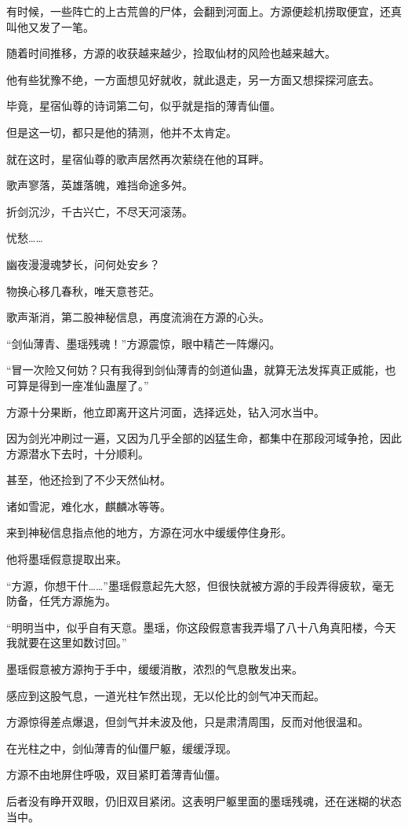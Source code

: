\begin{this_body}
有时候，一些阵亡的上古荒兽的尸体，会翻到河面上。方源便趁机捞取便宜，还真叫他又发了一笔。

随着时间推移，方源的收获越来越少，捡取仙材的风险也越来越大。

他有些犹豫不绝，一方面想见好就收，就此退走，另一方面又想探探河底去。

毕竟，星宿仙尊的诗词第二句，似乎就是指的薄青仙僵。

但是这一切，都只是他的猜测，他并不太肯定。

就在这时，星宿仙尊的歌声居然再次萦绕在他的耳畔。

歌声寥落，英雄落魄，难挡命途多舛。

折剑沉沙，千古兴亡，不尽天河滚荡。

忧愁……

幽夜漫漫魂梦长，问何处安乡？

物换心移几春秋，唯天意苍茫。

歌声渐消，第二股神秘信息，再度流淌在方源的心头。

“剑仙薄青、墨瑶残魂！”方源震惊，眼中精芒一阵爆闪。

“冒一次险又何妨？只有我得到剑仙薄青的剑道仙蛊，就算无法发挥真正威能，也可算是得到一座准仙蛊屋了。”

方源十分果断，他立即离开这片河面，选择远处，钻入河水当中。

因为剑光冲刷过一遍，又因为几乎全部的凶猛生命，都集中在那段河域争抢，因此方源潜水下去时，十分顺利。

甚至，他还捡到了不少天然仙材。

诸如雪泥，难化水，麒麟冰等等。

来到神秘信息指点他的地方，方源在河水中缓缓停住身形。

他将墨瑶假意提取出来。

“方源，你想干什……”墨瑶假意起先大怒，但很快就被方源的手段弄得疲软，毫无防备，任凭方源施为。

“明明当中，似乎自有天意。墨瑶，你这段假意害我弄塌了八十八角真阳楼，今天我就要在这里如数讨回。”

墨瑶假意被方源拘于手中，缓缓消散，浓烈的气息散发出来。

感应到这股气息，一道光柱乍然出现，无以伦比的剑气冲天而起。

方源惊得差点爆退，但剑气并未波及他，只是肃清周围，反而对他很温和。

在光柱之中，剑仙薄青的仙僵尸躯，缓缓浮现。

方源不由地屏住呼吸，双目紧盯着薄青仙僵。

后者没有睁开双眼，仍旧双目紧闭。这表明尸躯里面的墨瑶残魂，还在迷糊的状态当中。


\end{this_body}
